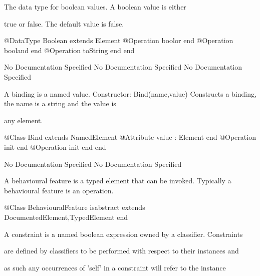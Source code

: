        The data type for boolean values. A boolean value is either

       true or false. The default value is false.
\begin{Interface}
@DataType Boolean extends Element
  @Operation boolor end
  @Operation booland end
  @Operation toString end
end
\end{Interface}
No Documentation Specified
No Documentation Specified
No Documentation Specified

      A binding is a named value.
      Constructor: Bind(name,value)
        Constructs a binding, the name is a string and the value is

        any element.
\begin{Interface}
@Class Bind extends NamedElement
  @Attribute value : Element end
  @Operation init end
  @Operation init end
end
\end{Interface}
No Documentation Specified
No Documentation Specified

      A behavioural feature is a typed element that can be invoked.
      Typically a behavioural feature is an operation.
\begin{Interface}
@Class BehaviouralFeature isabstract extends DocumentedElement,TypedElement
end
\end{Interface}

      A constraint is a named boolean expression owned by a classifier. Constraints

      are defined by classifiers to be performed with respect to their instances and

      as such any occurrences of 'self' in a constraint will refer to the instance

